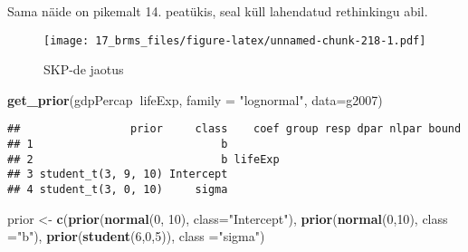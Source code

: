 \documentclass[]{article}
\newenvironment{Shaded}{\begin{snugshade}}{\end{snugshade}}
\newcommand{\KeywordTok}[1]{\textcolor[rgb]{0.13,0.29,0.53}{\textbf{#1}}}
\newcommand{\DataTypeTok}[1]{\textcolor[rgb]{0.13,0.29,0.53}{#1}}
\newcommand{\DecValTok}[1]{\textcolor[rgb]{0.00,0.00,0.81}{#1}}
\newcommand{\StringTok}[1]{\textcolor[rgb]{0.31,0.60,0.02}{#1}}
\newcommand{\OperatorTok}[1]{\textcolor[rgb]{0.81,0.36,0.00}{\textbf{#1}}}
\newcommand{\NormalTok}[1]{#1}
\begin{document}
Sama näide on pikemalt 14. peatükis, seal küll lahendatud rethinkingu
abil.

\begin{Shaded}
\end{Shaded}

\begin{figure}
\centering
\texttt{[image: 17\_brms\_files/figure-latex/unnamed-chunk-218-1.pdf]}
\caption{SKP-de jaotus}
\end{figure}

\begin{Shaded}
\begin{Highlighting}[]
\KeywordTok{get_prior}\NormalTok{(gdpPercap}\OperatorTok{~}\NormalTok{lifeExp, }\DataTypeTok{family =} \StringTok{"lognormal"}\NormalTok{, }\DataTypeTok{data=}\NormalTok{g2007)}
\end{Highlighting}
\end{Shaded}

\begin{verbatim}
##                 prior     class    coef group resp dpar nlpar bound
## 1                             b                                    
## 2                             b lifeExp                            
## 3 student_t(3, 9, 10) Intercept                                    
## 4 student_t(3, 0, 10)     sigma
\end{verbatim}

\begin{Shaded}
\begin{Highlighting}[]
\NormalTok{prior <-}\StringTok{ }\KeywordTok{c}\NormalTok{(}\KeywordTok{prior}\NormalTok{(}\KeywordTok{normal}\NormalTok{(}\DecValTok{0}\NormalTok{, }\DecValTok{10}\NormalTok{), }\DataTypeTok{class=}\StringTok{"Intercept"}\NormalTok{),}
           \KeywordTok{prior}\NormalTok{(}\KeywordTok{normal}\NormalTok{(}\DecValTok{0}\NormalTok{,}\DecValTok{10}\NormalTok{), }\DataTypeTok{class =}\StringTok{"b"}\NormalTok{),}
           \KeywordTok{prior}\NormalTok{(}\KeywordTok{student}\NormalTok{(}\DecValTok{6}\NormalTok{,}\DecValTok{0}\NormalTok{,}\DecValTok{5}\NormalTok{)), }\DataTypeTok{class =}\StringTok{"sigma"}\NormalTok{)}
\end{Highlighting}
\end{Shaded}
\end{document}
